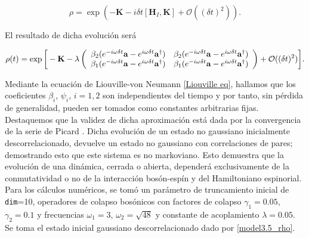\documentclass{report} %
\numberwithin{equation}{section}
\begin{document}
\begin{equation}
    \rho = \exp (-\mathbf{K} - i\delta t [\mathbf{H}_I,\mathbf{K}] + \mathcal{O}((\delta t)^2) ).
\end{equation}

El resultado de dicha evolución será

\begin{equation}
    \rho(t) = \exp \bigg[ -\mathbf{K} -\lambda \left(\begin{array}{cc}
        \beta_2 (e^{-i\omega \delta t}{\bf a}-e^{i\omega \delta t}{\bf a}^{\dagger}) & \beta_2 (e^{-i\omega \delta t}{\bf a}-e^{i\omega \delta t}{\bf a}^{\dagger})  \\
        \beta_1 (e^{-i\omega \delta t}{\bf a}-e^{i\omega \delta t}{\bf a}^{\dagger}) & \beta_1 (e^{-i\omega \delta t}{\bf a}-e^{i\omega \delta t}{\bf a}^{\dagger}) 
    \end{array}\right) + \mathcal{O}((\delta t)^2)
    \bigg].
    \label{model3.4_rho1_ev}
\end{equation}

Mediante la ecuación de Liouville-von Neumann \eqref{Liouville eq}, hallamos que los coeficientes $\beta_i$, $\psi_i$, $i=1,2$ son independientes del tiempo y por tanto, sin pérdida de generalidad, pueden ser tomados como constantes arbitrarias fijas. Destaquemos que la validez de dicha aproximación está dada por la convergencia de la serie de Picard \cite{HeinzPetruccione}. Dicha evolución de un estado no gaussiano inicialmente descorrelacionado, devuelve un estado no gaussiano con correlaciones de pares; demostrando esto que este sistema es no markoviano. Esto demuestra que la evolución de una dinámica, cerrada o abierta, dependerá exclusivamente de la conmutatividad o no de la interacción bosón-espín y del Hamiltoniano espinorial. \\

Para los cálculos numéricos, se tomó un parámetro de truncamiento inicial de \texttt{dim}=10, operadores de colapso bosónicos con factores de colapso $\gamma_1 = 0.05$, $\gamma_2 = 0.1$ y frecuencias $\omega_1 = 3$,  $\omega_2 = \sqrt{48}$ y  constante de acoplamiento $\lambda = 0.05$. Se toma el estado inicial gaussiano descorrelacionado dado por \eqref{model3.5_rho}.
\end{document}
